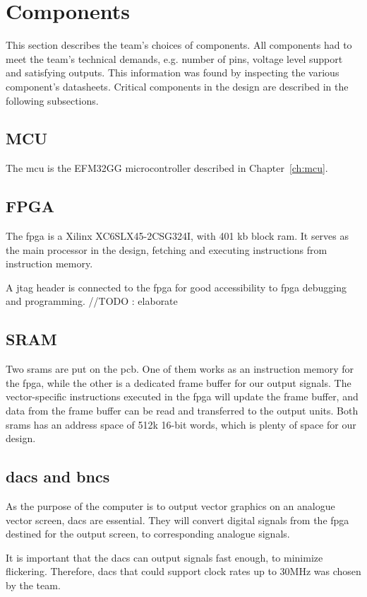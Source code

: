 \section{Components}
This section describes the team's choices of components.
All components had to meet the team's technical demands, e.g. number of pins, voltage level support and satisfying outputs.
This information was found by inspecting the various component's datasheets.
Critical components in the design are described in the following subsections.

\subsection{MCU}
The \gls{mcu} is the EFM32GG microcontroller described in Chapter~\ref{ch:mcu}.

\subsection{FPGA}
The \gls{fpga} is a Xilinx XC6SLX45-2CSG324I, with 401 kb block \gls{ram}.
It serves as the main processor in the design, fetching and executing instructions from instruction memory.

A \gls{jtag} header is connected to the \gls{fpga} for good accessibility to \gls{fpga} debugging and programming.
//TODO : elaborate

\subsection{SRAM}
Two \gls{sram}s are put on the \gls{pcb}.
One of them works as an instruction memory for the \gls{fpga}, while the other is a dedicated frame buffer for our output signals.
The vector-specific instructions executed in the \gls{fpga} will update the frame buffer, and data from the frame buffer can be read and transferred to the output units.
Both \gls{sram}s has an address space of 512k 16-bit words, which is plenty of space for our design.

\subsection{\gls{dac}s and \gls{bnc}s}
As the purpose of the computer is to output vector graphics on an analogue vector screen, \gls{dac}s are essential.
They will convert digital signals from the \gls{fpga} destined for the output screen, to corresponding analogue signals.

It is important that the \gls{dac}s can output signals fast enough, to minimize flickering.
Therefore, \gls{dac}s that could support clock rates up to 30MHz was chosen by the team.

